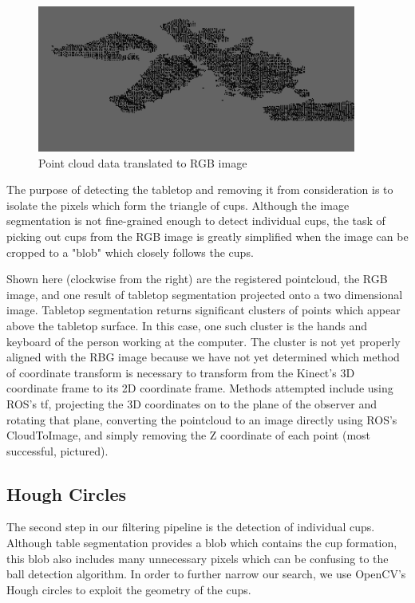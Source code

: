 \documentclass[letterpaper, 10 pt, conference]{ieeeconf}  %
\begin{document}
\begin{figure}[thpb]
      \centering
	  \includegraphics[scale =0.5]{point_rgb}
      \caption{Point cloud data translated to RGB image}
      \label{fig:point_rgb}
\end{figure}

The purpose of detecting the tabletop and removing it from consideration is to isolate the pixels which form the triangle of cups.  Although the image segmentation is not fine-grained enough to detect individual cups, the task of picking out cups from the RGB image is greatly simplified when the image can be cropped to a "blob" which closely follows the cups.

Shown here (clockwise from the right) are the registered pointcloud, the RGB image, and one result of tabletop segmentation projected onto a two dimensional image.  Tabletop segmentation returns significant clusters of points which appear above the tabletop surface.  In this case, one such cluster is the hands and keyboard of the person working at the computer.  The cluster is not yet properly aligned with the RBG image because we have not yet determined which method of coordinate transform is necessary to transform from the Kinect's 3D coordinate frame to its 2D coordinate frame.  Methods attempted include using ROS's tf, projecting the 3D coordinates on to the plane of the observer and rotating that plane, converting the pointcloud to an image directly using ROS's CloudToImage, and simply removing the Z coordinate of each point (most successful, pictured).


\subsection{Hough Circles}

The second step in our filtering pipeline is the detection of individual cups.  Although table segmentation provides a blob which contains the cup formation, this blob also includes many unnecessary pixels which can be confusing to the ball detection algorithm.  In order to further narrow our search, we use OpenCV's Hough circles to exploit the geometry of the cups.  
\end{document}
